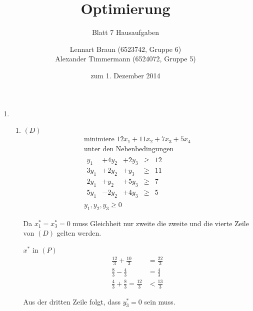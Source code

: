\documentclass[a4paper]{scrartcl}
\title{Optimierung}
\subtitle{Blatt 7 Hausaufgaben}
\author{
	Lennart Braun (6523742, Gruppe 6) \\
    Alexander Timmermann (6524072, Gruppe 5)
}
\date{zum 1. Dezember 2014}
\begin{document}
\maketitle

\begin{enumerate}[label=\bfseries\arabic*.]
    \item %
        \begin{enumerate}
            \item $(D)$
                \begin{equation}
                    \begin{gathered}
                        \text{minimiere }
                        12x_1 + 11x_2 + 7x_3 + 5x_4 \\
                        \text{unter den Nebenbedingungen} \\
                        \begin{array}{rrrcr}
                            y_1 & + 4y_2 & +2y_3 & \geq & 12 \\
                            3y_1 & +2y_2 & +y_3 & \geq & 11 \\
                            2y_1 & +y_2 & +5y_3 & \geq & 7 \\
                            5y_1 & -2y_2 & +4y_3 & \geq & 5
                        \end{array} \\
                        y_1, y_2, y_3 \geq 0
                    \end{gathered}
                \end{equation}

                Da $x_1^* = x_3^* = 0$ muss Gleichheit nur zweite die zweite und
                die vierte Zeile von $(D)$ gelten werden.

                $x^*$ in $(P)$
                \begin{equation}
                    \begin{split}
                        \frac{12}{3} + \frac{10}{3} &= \frac{22}{3} \\
                        \frac{8}{3} - \frac{4}{3} &= \frac{4}{3} \\
                        \frac{4}{3} + \frac{8}{3} = \frac{12}{3} &< \frac{13}{3}
                    \end{split}
                \end{equation}

                Aus der dritten Zeile folgt, dass $y_3^* = 0$ sein muss.


\end{enumerate}
\end{enumerate}
\end{document}
